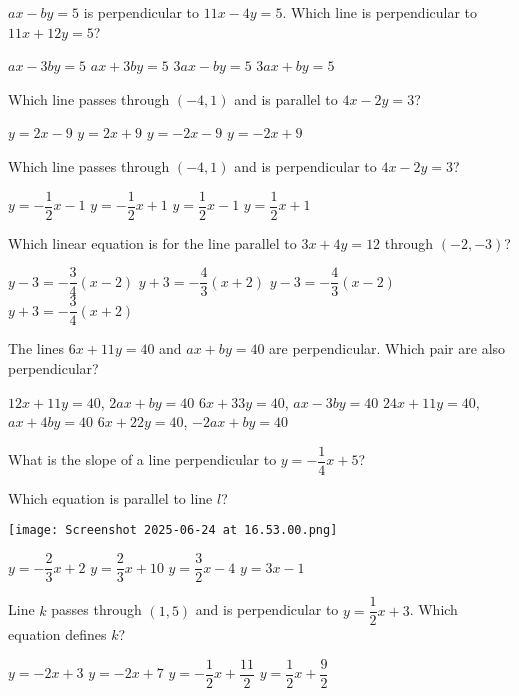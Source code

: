 \documentclass[12pt]{exam}
\begin{document}
\begin{questions}
\question $ax - by = 5$ is perpendicular to $11x - 4y = 5$. Which line is perpendicular to $11x + 12y = 5$?
\begin{choices}
\choice $ax - 3by = 5$
\choice $ax + 3by = 5$
\choice $3ax - by = 5$
\choice $3ax + by = 5$
\end{choices}

\question Which line passes through $(-4,1)$ and is parallel to $4x - 2y = 3$?
\begin{choices}
\choice $y = 2x - 9$
\choice $y = 2x + 9$
\choice $y = -2x - 9$
\choice $y = -2x + 9$
\end{choices}

\question Which line passes through $(-4,1)$ and is perpendicular to $4x - 2y = 3$?
\begin{choices}
\choice $y = -\dfrac{1}{2}x - 1$
\choice $y = -\dfrac{1}{2}x + 1$
\choice $y = \dfrac{1}{2}x - 1$
\choice $y = \dfrac{1}{2}x + 1$
\end{choices}

\question Which linear equation is for the line parallel to $3x + 4y = 12$ through $(-2,-3)$?
\begin{choices}
\choice $y - 3 = -\dfrac{3}{4}(x - 2)$
\choice $y + 3 = -\dfrac{4}{3}(x + 2)$
\choice $y - 3 = -\dfrac{4}{3}(x - 2)$
\choice $y + 3 = -\dfrac{3}{4}(x + 2)$
\end{choices}

\question The lines $6x + 11y = 40$ and $ax + by = 40$ are perpendicular. Which pair are also perpendicular?
\begin{choices}
\choice $12x + 11y = 40$, $2ax + by = 40$
\choice $6x + 33y = 40$, $ax - 3by = 40$
\choice $24x + 11y = 40$, $ax + 4by = 40$
\choice $6x + 22y = 40$, $-2ax + by = 40$
\end{choices}

\question What is the slope of a line perpendicular to $y = -\dfrac{1}{4}x + 5$?

\question Which equation is parallel to line $l$?
\begin{center}
\texttt{[image: Screenshot 2025-06-24 at 16.53.00.png]}
\end{center}
\begin{choices}
\choice $y = -\dfrac{2}{3}x + 2$
\choice $y = \dfrac{2}{3}x + 10$
\choice $y = \dfrac{3}{2}x - 4$
\choice $y = 3x - 1$
\end{choices}

\question Line $k$ passes through $(1,5)$ and is perpendicular to $y = \dfrac{1}{2}x + 3$. Which equation defines $k$?
\begin{choices}
\choice $y = -2x + 3$
\choice $y = -2x + 7$
\choice $y = -\dfrac{1}{2}x + \dfrac{11}{2}$
\choice $y = \dfrac{1}{2}x + \dfrac{9}{2}$
\end{choices}


\end{questions}
\end{document}

